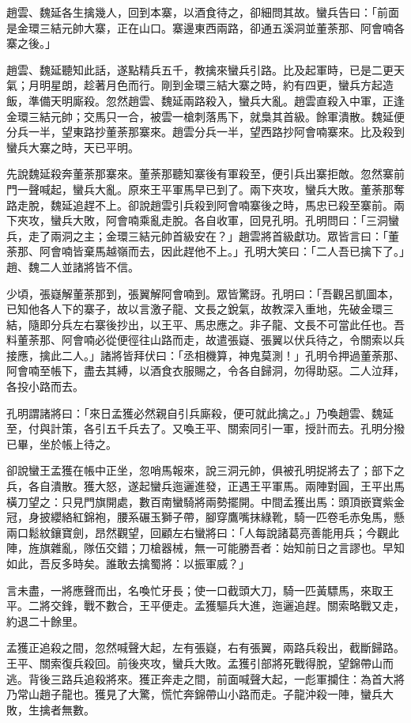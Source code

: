 趙雲、魏延各生擒幾人，回到本寨，以酒食待之，卻細問其故。蠻兵告曰：「前面是金環三結元帥大寨，正在山口。寨邊東西兩路，卻通五溪洞並董荼那、阿會喃各寨之後。」

趙雲、魏延聽知此話，遂點精兵五千，教擒來蠻兵引路。比及起軍時，已是二更天氣；月明星朗，趁著月色而行。剛到金環三結大寨之時，約有四更，蠻兵方起造飯，準備天明廝殺。忽然趙雲、魏延兩路殺入，蠻兵大亂。趙雲直殺入中軍，正逢金環三結元帥；交馬只一合，被雲一槍刺落馬下，就梟其首級。餘軍潰散。魏延便分兵一半，望東路抄董荼那寨來。趙雲分兵一半，望西路抄阿會喃寨來。比及殺到蠻兵大寨之時，天已平明。

先說魏延殺奔董荼那寨來。董荼那聽知寨後有軍殺至，便引兵出寨拒敵。忽然寨前門一聲喊起，蠻兵大亂。原來王平軍馬早已到了。兩下夾攻，蠻兵大敗。董荼那奪路走脫，魏延追趕不上。卻說趙雲引兵殺到阿會喃寨後之時，馬忠已殺至寨前。兩下夾攻，蠻兵大敗，阿會喃乘亂走脫。各自收軍，回見孔明。孔明問曰：「三洞蠻兵，走了兩洞之主；金環三結元帥首級安在？」趙雲將首級獻功。眾皆言曰：「董荼那、阿會喃皆棄馬越嶺而去，因此趕他不上。」孔明大笑曰：「二人吾已擒下了。」趙、魏二人並諸將皆不信。

少頃，張嶷解董荼那到，張翼解阿會喃到。眾皆驚訝。孔明曰：「吾觀呂凱圖本，已知他各人下的寨子，故以言激子龍、文長之銳氣，故教深入重地，先破金環三結，隨即分兵左右寨後抄出，以王平、馬忠應之。非子龍、文長不可當此任也。吾料董荼那、阿會喃必從便徑往山路而走，故遣張嶷、張翼以伏兵待之，令關索以兵接應，擒此二人。」諸將皆拜伏曰：「丞相機算，神鬼莫測！」孔明令押過董荼那、阿會喃至帳下，盡去其縛，以酒食衣服賜之，令各自歸洞，勿得助惡。二人泣拜，各投小路而去。

孔明謂諸將曰：「來日孟獲必然親自引兵廝殺，便可就此擒之。」乃喚趙雲、魏延至，付與計策，各引五千兵去了。又喚王平、關索同引一軍，授計而去。孔明分撥已畢，坐於帳上待之。

卻說蠻王孟獲在帳中正坐，忽哨馬報來，說三洞元帥，俱被孔明捉將去了；部下之兵，各自潰散。獲大怒，遂起蠻兵迤邐進發，正遇王平軍馬。兩陣對圓，王平出馬橫刀望之：只見門旗開處，數百南蠻騎將兩勢擺開。中間孟獲出馬：頭頂嵌寶紫金冠，身披纓絡紅錦袍，腰系碾玉獅子帶，腳穿鷹嘴抹綠靴，騎一匹卷毛赤兔馬，懸兩口鬆紋鑲寶劍，昂然觀望，回顧左右蠻將曰：「人每說諸葛亮善能用兵；今觀此陣，旌旗雜亂，隊伍交錯；刀槍器械，無一可能勝吾者：始知前日之言謬也。早知如此，吾反多時矣。誰敢去擒蜀將：以振軍威？」

言未盡，一將應聲而出，名喚忙牙長；使一口截頭大刀，騎一匹黃驃馬，來取王平。二將交鋒，戰不數合，王平便走。孟獲驅兵大進，迤邐追趕。關索略戰又走，約退二十餘里。

孟獲正追殺之間，忽然喊聲大起，左有張嶷，右有張翼，兩路兵殺出，截斷歸路。王平、關索復兵殺回。前後夾攻，蠻兵大敗。孟獲引部將死戰得脫，望錦帶山而逃。背後三路兵追殺將來。獲正奔走之間，前面喊聲大起，一彪軍攔住：為首大將乃常山趙子龍也。獲見了大驚，慌忙奔錦帶山小路而走。子龍沖殺一陣，蠻兵大敗，生擒者無數。

